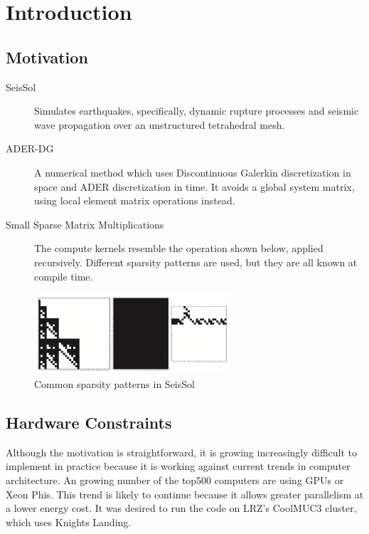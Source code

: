 \chapter{Introduction}
\label{chapter:Introduction}


\section{Motivation}

\begin{description}
	\item[SeisSol]
    Simulates earthquakes, specifically, dynamic rupture processes and seismic wave propagation over an unstructured tetrahedral mesh. 

    \item[ADER-DG]
    A numerical method which uses Discontinuous Galerkin discretization in space and ADER discretization in time. It avoids a global system matrix, using local element matrix operations instead.

    \item[Small Sparse Matrix Multiplications]
    The compute kernels resemble the operation shown below, applied recursively. Different sparsity patterns are used, but they are all known at compile time.
\end{description}

\begin{figure}
  \centering
  \includegraphics[height=3cm]{images/seissol_visc.png}
  \caption{Common sparsity patterns in SeisSol}
  \label{fig:seissol_star}
\end{figure}

\section{Hardware Constraints}

Although the motivation is straightforward, it is growing increasingly difficult to implement in practice because it is working against current trends in computer architecture. An growing number of the top500 computers are using GPUs or Xeon Phis. This trend is likely to continue because it allows greater parallelism at a lower energy cost. It was desired to run the code on LRZ's CoolMUC3 cluster, which uses Knights Landing.

